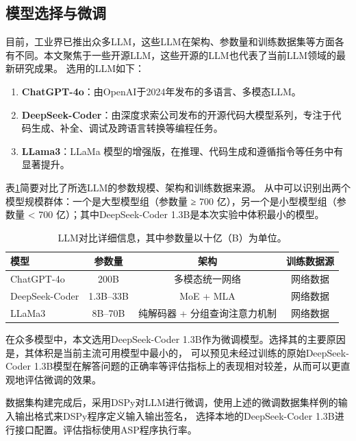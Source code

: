 \subsection{模型选择与微调}
目前，工业界已推出众多LLM，这些LLM在架构、参数量和训练数据集等方面各有不同。本文聚焦于一些开源LLM，这些开源的LLM也代表了当前LLM领域的最新研究成果。
选用的LLM如下：
\begin{enumerate}[itemsep=0pt,parsep=0pt]
\item \textbf{ChatGPT-4o}：由OpenAI于2024年发布的多语言、多模态LLM。
\item \textbf{DeepSeek-Coder}：由深度求索公司发布的开源代码大模型系列，专注于代码生成、补全、调试及跨语言转换等编程任务。
\item \textbf{LLama3}：LLaMa 模型的增强版，在推理、代码生成和遵循指令等任务中有显著提升。
\end{enumerate}
表\ref{tab:llm-comparison}简要对比了所选LLM的参数规模、架构和训练数据来源。
从中可以识别出两个模型规模群体：一个是大型模型组（参数量 ≥ 700 亿），另一个是小型模型组（参数量 < 700 亿）；其中DeepSeek-Coder 1.3B是本次实验中体积最小的模型。

\begin{table}[ht]
    \centering
    \begin{tabular}{lccc}
        \toprule
        \textbf{模型} & \textbf{参数量} & \textbf{架构} & \textbf{训练数据源} \\
        \midrule
        ChatGPT-4o    & 200B      & 多模态统一网络           & 网络数据         \\
        DeepSeek-Coder       & 1.3B--33B      & MoE + MLA            & 网络数据    \\
        LLaMa3         & 8B--70B   & 纯解码器 + 分组查询注意力机制   & 网络数据         \\
        \bottomrule
    \end{tabular}
    \caption{LLM对比详细信息，其中参数量以十亿（B）为单位。}
    \label{tab:llm-comparison}
\end{table}

在众多模型中，本文选用DeepSeek-Coder 1.3B作为微调模型。选择其的主要原因是，其体积是当前主流可用模型中最小的，
可以预见未经过训练的原始DeepSeek-Coder 1.3B模型在解答问题的正确率等评估指标上的表现相对较差，从而可以更直观地评估微调的效果。

数据集构建完成后，采用DSPy对LLM进行微调，使用上述的微调数据集样例的输入输出格式来DSPy程序定义输入输出签名，
选择本地的DeepSeek-Coder 1.3B进行接口配置。评估指标使用ASP程序执行率。

